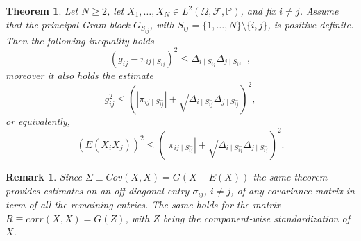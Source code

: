 \documentclass[10pt,a4paper]{amsart}
\newtheorem{theorem}{Theorem}
\newtheorem{remark}{Remark}
\begin{document}
\begin{theorem}
Let $N\geq 2$, let $X_1,\dots,X_N\in L^2(\Omega,\mathcal F,\mathbb P)$, and fix $i\neq j$. Assume that the principal Gram block $G_{S^{-}_{ij}}$, with $S^{-}_{ij}=\{1,\dots,N\}\setminus\{i,j\}$, is positive definite. Then the following inequality holds
\begin{equation}\label{residual}
\left(
{g}_{ij}-\pi_{ij\mid S^{-}_{ij}}
\right)^2
\leq
\Delta_{i\mid S^{-}_{ij}}\Delta_{j\mid S^{-}_{ij}}\;\;,
\end{equation}
moreover it also holds the estimate
\begin{equation}\label{N_general}
{g}_{ij}^2
\leq
\left(
|\pi_{ij\mid S^{-}_{ij}}|
+
\sqrt{
\Delta_{i\mid S^{-}_{ij}}\Delta_{j\mid S^{-}_{ij}}
}
\right)^2,
\end{equation}
or equivalently,
\begin{equation}
\left(E(X_iX_j)\right)^2
\leq
\left(
|\pi_{ij\mid S^{-}_{ij}}|
+
\sqrt{
\Delta_{i\mid S^{-}_{ij}}\Delta_{j\mid S^{-}_{ij}}
}
\right)^2.
\end{equation}
\end{theorem}
\begin{remark} Since $\Sigma\equiv Cov(X,X)=G(X-E(X))$ the same theorem provides estimates on an off-diagonal entry $\sigma_{ij}$, $i\neq j$, of any covariance matrix in term of all the remaining entries. The same holds for the matrix $R\equiv corr(X,X)=G(Z)$, with $Z$  being the component-wise standardization of $X$.  
\end{remark}
\end{document}
